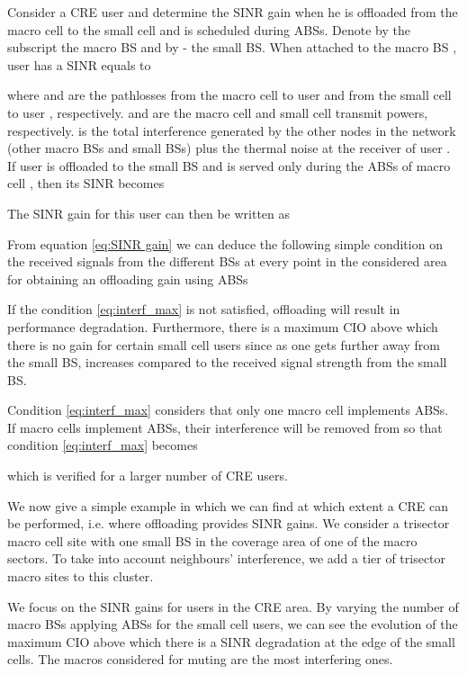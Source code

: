 \documentclass[conference]{IEEEtran}
\begin{document}
	Consider a \ac{CRE} user  and determine the \ac{SINR} gain when he is offloaded from the macro cell to the small cell and is scheduled during \acp{ABS}. Denote by the subscript  the macro \ac{BS} and by  - the small \ac{BS}. When attached to the macro \ac{BS} , user  has a \ac{SINR} equals to
	
	where  and  are the pathlosses from the macro cell  to user  and from the small cell  to user , respectively.  and  are the macro cell and small cell transmit powers, respectively.  is the total interference generated by the other nodes in the network (other macro \acp{BS} and small \acp{BS}) plus the thermal noise at the receiver of user . If user  is offloaded to the small \ac{BS} and is served only during the \acp{ABS} of macro cell , then its \ac{SINR} becomes
	
	The \ac{SINR} gain for this user can then be written as
	
	From equation \eqref{eq:SINR gain} we can deduce the following simple condition on the received signals from the different \acp{BS} at every point in the considered area for obtaining an offloading gain using \acp{ABS}
	
	If the condition \eqref{eq:interf_max} is not satisfied, offloading will result in performance degradation. Furthermore, there is a maximum \ac{CIO} above which there is no gain for certain small cell users since as one gets further away from the small \ac{BS},  increases compared to the received signal strength from the small \ac{BS}.
	
	Condition \eqref{eq:interf_max} considers that only one macro cell implements \acp{ABS}. If  macro cells implement \acp{ABS}, their interference will be removed from  so that condition \eqref{eq:interf_max} becomes
	
	which is verified for a larger number of \ac{CRE} users.
	
	We now give a simple example in which we can find at which extent a \ac{CRE} can be performed, i.e. where offloading provides \ac{SINR} gains. We consider a trisector macro cell site with one small \ac{BS} in the coverage area of one of the macro sectors. To take into account neighbours' interference, we add a tier of trisector macro sites to this cluster.

	We focus on the \ac{SINR} gains for users in the \ac{CRE} area. By varying the number of macro \acp{BS} applying \acp{ABS} for the small cell users, we can see the evolution of the maximum \ac{CIO} above which there is a \ac{SINR} degradation at the edge of the small cells. The macros considered for muting are the most interfering ones.
\end{document}
